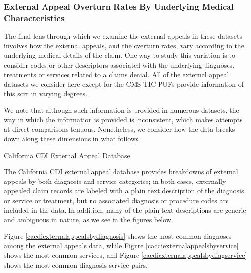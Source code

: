 \documentclass[12pt, a4paper,twoside]{report}
\theoremstyle{plain} %
\theoremstyle{definition} %
\theoremstyle{remark} %
\numberwithin{equation}{chapter}
\begin{document}
		\subsubsection{External Appeal Overturn Rates By Underlying Medical Characteristics}
		
		The final lens through which we examine the external appeals in these datasets involves how the external appeals, and the overturn rates, vary according to the underlying medical details of the claim. One way to study this variation is to consider codes or other descriptors associated with the underlying diagnoses, treatments or services related to a claims denial. All of the external appeal datasets we consider here except for the CMS TIC PUFs provide information of this sort in varying degrees.
		
		We note that although such information is provided in numerous datasets, the way in which the information is provided is inconsistent, which makes attempts at direct comparisons tenuous. Nonetheless, we consider how the data breaks down along these dimensions in what follows.
		
		\underline{California CDI External Appeal Database}
		
		The California CDI external appeal database provides breakdowns of external appeals by both diagnosis and service categories; in both cases, externally appealed claim records are labeled with a plain text description of the diagnosis or service or treatment, but no associated diagnosis or procedure codes are included in the data. In addition, many of the plain text descriptions are generic and ambiguous in nature, as we see in the figures below.
		
		Figure \ref{cacdiexternalappealsbydiagnosis} shows the most common diagnoses among the external appeals data, while Figure \ref{cacdiexternalappealsbyservice} shows the most common services, and Figure \ref{cacdiexternalappealsbydiagservice} shows the most common diagnosis-service pairs.
		
\end{document}
